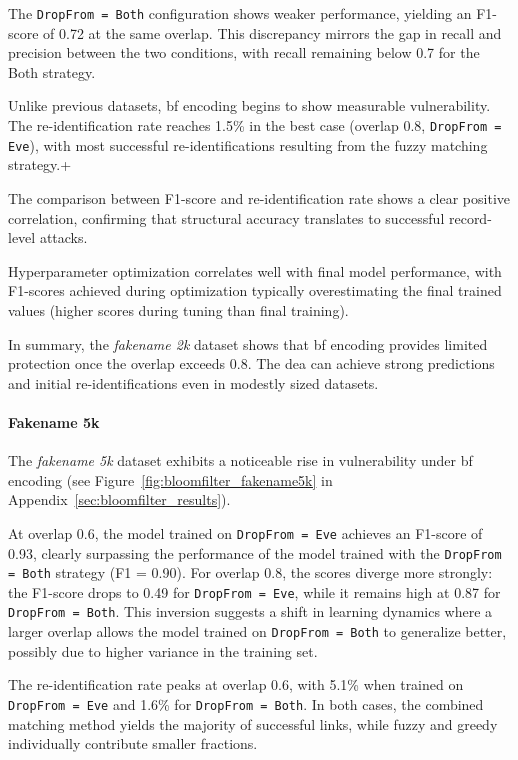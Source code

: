 The \texttt{DropFrom = Both} configuration shows weaker performance, yielding an F1-score of 0.72 at the same overlap.
This discrepancy mirrors the gap in recall and precision between the two conditions, with recall remaining below 0.7 for the Both strategy.

Unlike previous datasets, \ac{bf} encoding begins to show measurable vulnerability.
The re-identification rate reaches 1.5\% in the best case (overlap 0.8, \texttt{DropFrom = Eve}), with most successful re-identifications resulting from the fuzzy matching strategy.+

The comparison between F1-score and re-identification rate shows a clear positive correlation, confirming that structural accuracy translates to successful record-level attacks.

Hyperparameter optimization correlates well with final model performance, with F1-scores achieved during optimization typically overestimating the final trained values (higher scores during tuning than final training).

In summary, the \textit{fakename 2k} dataset shows that \ac{bf} encoding provides limited protection once the overlap exceeds 0.8.
The \ac{dea} can achieve strong predictions and initial re-identifications even in modestly sized datasets.

\paragraph{Fakename 5k}

The \textit{fakename 5k} dataset exhibits a noticeable rise in vulnerability under \ac{bf} encoding (see Figure~\ref{fig:bloomfilter_fakename5k} in Appendix~\ref{sec:bloomfilter_results}).

At overlap 0.6, the model trained on \texttt{DropFrom = Eve}  achieves an F1-score of 0.93, clearly surpassing the performance of the model trained with the \texttt{DropFrom = Both} strategy (F1 = 0.90).
For overlap 0.8, the scores diverge more strongly: the F1-score drops to 0.49 for \texttt{DropFrom = Eve}, while it remains high at 0.87 for \texttt{DropFrom = Both}.
This inversion suggests a shift in learning dynamics where a larger overlap allows the model trained on \texttt{DropFrom = Both} to generalize better, possibly due to higher variance in the training set.

The re-identification rate peaks at overlap 0.6, with 5.1\% when trained on \texttt{DropFrom = Eve} and 1.6\% for \texttt{DropFrom = Both}.
In both cases, the combined matching method yields the majority of successful links, while fuzzy and greedy individually contribute smaller fractions.

